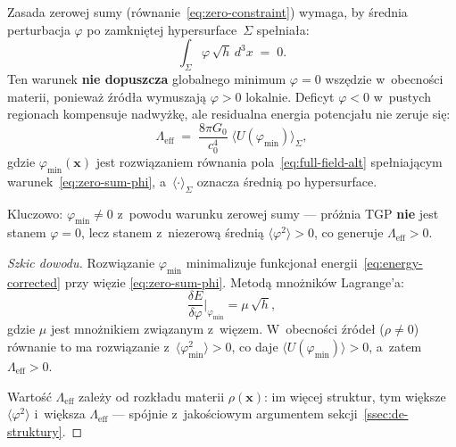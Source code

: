 \begin{proposition}\label{prop:Lambda-positive}
Zasada zerowej sumy (r\'ownanie~\ref{eq:zero-constraint})
wymaga, by \'srednia perturbacja $\varphi$ po zamkni\k{e}tej
hypersurface~$\Sigma$ spe\l{}nia\l{}a:
\begin{equation}\label{eq:zero-sum-phi}
    \int_\Sigma \varphi\,\sqrt{h}\,d^3x \;=\; 0.
\end{equation}
Ten warunek \textbf{nie dopuszcza} globalnego minimum
$\varphi = 0$ wsz\k{e}dzie w~obecno\'sci materii, poniewa\.z
\'zr\'od\l{}a wymuszaj\k{a} $\varphi > 0$ lokalnie. Deficyt
$\varphi < 0$ w~pustych regionach kompensuje nadwy\.zk\k{e},
ale residualna energia potencja\l{}u nie zeruje si\k{e}:
\begin{equation}\label{eq:Lambda-eff-def}
  \boxed{
    \Lambda_{\mathrm{eff}}
    \;=\; \frac{8\pi G_0}{c_0^4}\;
    \bigl\langle U(\varphi_{\min}) \bigr\rangle_\Sigma,
  }
\end{equation}
gdzie $\varphi_{\min}(\mathbf{x})$ jest rozwi\k{a}zaniem
r\'ownania pola~\eqref{eq:full-field-alt} spe\l{}niaj\k{a}cym
warunek~\eqref{eq:zero-sum-phi}, a~$\langle\cdot\rangle_\Sigma$
oznacza \'sredni\k{a} po hypersurface.

Kluczowo: $\varphi_{\min} \neq 0$ z~powodu warunku
zerowej sumy --- pr\'o\.znia TGP \textbf{nie} jest stanem
$\varphi = 0$, lecz stanem z~niezerow\k{a}
\'sredni\k{a} $\langle\varphi^2\rangle > 0$, co generuje
$\Lambda_{\mathrm{eff}} > 0$.
\end{proposition}

\begin{proof}[Szkic dowodu]
Rozwi\k{a}zanie $\varphi_{\min}$ minimalizuje funkcjona\l{}
energii~\eqref{eq:energy-corrected} przy wi\k{e}zie
\eqref{eq:zero-sum-phi}. Metod\k{a} mno\.znik\'ow Lagrange'a:
\begin{equation}
    \frac{\delta E}{\delta\varphi}\bigg|_{\varphi_{\min}}
    = \mu\,\sqrt{h},
\end{equation}
gdzie $\mu$ jest mno\.znikiem zwi\k{a}zanym z~wi\k{e}zem.
W~obecno\'sci \'zr\'ode\l{} ($\rho \neq 0$) r\'ownanie to
ma rozwi\k{a}zanie z~$\langle\varphi_{\min}^2\rangle > 0$,
co daje $\langle U(\varphi_{\min})\rangle > 0$, a~zatem
$\Lambda_{\mathrm{eff}} > 0$.

Warto\'s\'c $\Lambda_{\mathrm{eff}}$ zale\.zy od rozk\l{}adu
materii $\rho(\mathbf{x})$: im wi\k{e}cej struktur, tym wi\k{e}ksze
$\langle\varphi^2\rangle$ i~wi\k{e}ksza
$\Lambda_{\mathrm{eff}}$ --- sp\'ojnie
z~jako\'sciowym argumentem sekcji~\ref{ssec:de-struktury}.
\end{proof}

